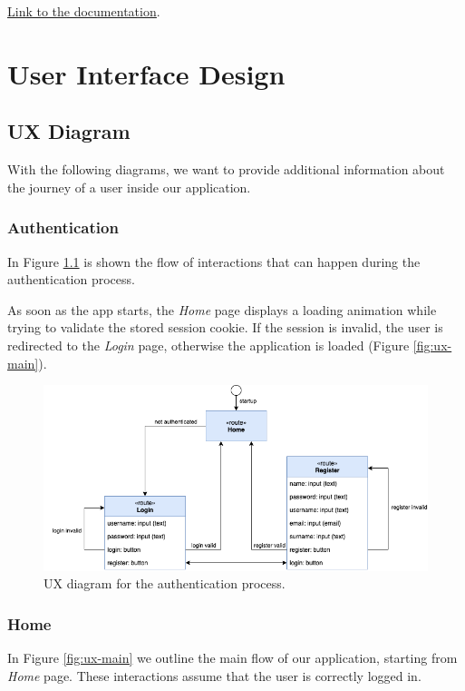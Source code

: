 \underline{\href{https://comuni-ita.herokuapp.com}{Link to the documentation}}.



\chapter{User Interface Design}

\section{UX Diagram}
With the following diagrams, we want to provide additional information about the journey of a user inside our application.

\subsection{Authentication}
In Figure \ref{fig:ux-auth} is shown the flow of interactions that can happen during the authentication process.

As soon as the app starts, the \emph{Home} page displays a loading animation while trying to validate the stored session cookie.
If the session is invalid, the user is redirected to the \emph{Login} page, otherwise the application is loaded (Figure \ref{fig:ux-main}).

\begin{figure}[H]
      \includegraphics{ux-diagram/ux-auth.png}
      \caption{UX diagram for the authentication process.}
      \label{fig:ux-auth}
\end{figure}

\subsection{Home}
In Figure \ref{fig:ux-main} we outline the main flow of our application, starting from \emph{Home} page.
These interactions assume that the user is correctly logged in.

